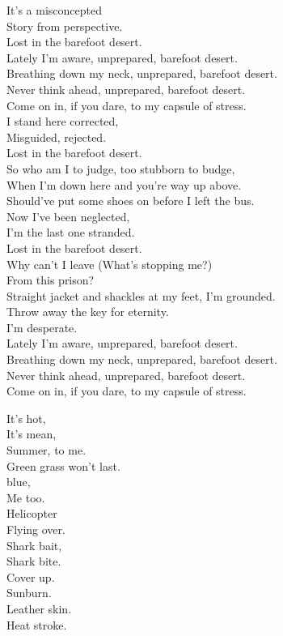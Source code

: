 It's a misconcepted \\
Story from perspective. \\
Lost in the barefoot desert. \\

Lately I'm aware, unprepared, barefoot desert. \\
Breathing down my neck, unprepared, barefoot desert. \\
Never think ahead, unprepared, barefoot desert. \\
Come on in, if you dare, to my capsule of stress. \\

I stand here corrected, \\
Misguided, rejected. \\
Lost in the barefoot desert. \\

So who am I to judge, too stubborn to budge, \\
When I'm down here and you're way up above. \\
Should've put some shoes on before I left the bus. \\

Now I've been neglected, \\
I'm the last one stranded. \\
Lost in the barefoot desert. \\
Why can't I leave (What's stopping me?) \\
From this prison? \\
Straight jacket and shackles at my feet, I'm grounded. \\
Throw away the key for eternity. \\
I'm desperate. \\

Lately I'm aware, unprepared, barefoot desert. \\
Breathing down my neck, unprepared, barefoot desert. \\
Never think ahead, unprepared, barefoot desert. \\
Come on in, if you dare, to my capsule of stress. \\





It's hot, \\
It's mean, \\
Summer, to me. \\
Green grass won't last. \\
 blue, \\
Me too. \\
Helicopter \\
Flying over. \\
Shark bait, \\
Shark bite. \\
Cover up. \\
Sunburn. \\
Leather skin. \\
Heat stroke. \\

